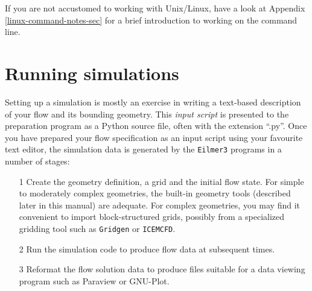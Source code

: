\documentclass[12pt,a4paper,twoside]{article}
\begin{document}
\medskip
If you are not accustomed to working with Unix/Linux, 
have a look at Appendix\,\ref{linux-command-notes-sec}
for a brief introduction to working on the command line.


\section{Running simulations}
%
Setting up a simulation is mostly an exercise in writing a text-based 
description of your flow and its bounding geometry.
This \textit{input script} is presented to the preparation program as 
a Python source file, often with the extension ``.py''.
Once you have prepared your flow specification as an input script using your favourite text editor, 
the simulation data is generated by the \texttt{Eilmer3} programs in a number of stages:
\begin{itemize}
\item[1] Create the geometry definition, a grid and the initial flow state.
  For simple to moderately complex geometries, the built-in geometry tools (described later in this manual)
  are adequate.
  For complex geometries, you may find it convenient to import block-structured grids, 
  possibly from a specialized gridding tool such as \texttt{Gridgen} or \texttt{ICEMCFD}.
\item[2] Run the simulation code to produce flow data at subsequent times.
\item[3] Reformat the flow solution data to produce files suitable for a data viewing program such as Paraview or GNU-Plot.
\end{itemize}

\newpage
\end{document}
